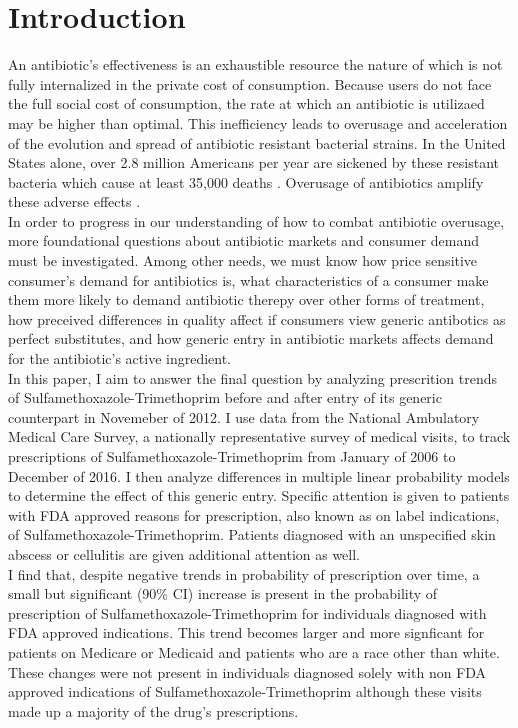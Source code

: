 \chapter{Introduction}
An antibiotic's effectiveness is an exhaustible resource the nature of which is not fully internalized in the private cost of consumption. Because users do not face the full social cost of consumption, the rate at which an antibiotic is utilizaed may be higher than optimal. This inefficiency leads to overusage and acceleration of the evolution and spread of antibiotic resistant bacterial strains. In the United States alone, over 2.8 million Americans per year are sickened by these resistant bacteria which cause at least 35,000 deaths \cite{centers_for_disease_control_and_prevention_us_antibiotic_2019}. Overusage of antibiotics amplify these adverse effects \cite{gerber_outpatient_2019}.\\
\indent In order to progress in our understanding of how to combat antibiotic overusage, more foundational questions about antibiotic markets and consumer demand must be investigated. Among other needs, we must know how price sensitive consumer's demand for antibiotics is, what characteristics of a consumer make them more likely to demand antibiotic therepy over other forms of treatment, how preceived differences in quality affect if consumers view generic antibotics as perfect substitutes, and how generic entry in antibiotic markets affects demand for the antibiotic's active ingredient.\\
\indent In this paper, I aim to answer the final question by analyzing prescrition trends of Sulfamethoxazole-Trimethoprim before and after entry of its generic counterpart in Novemeber of 2012. I use data from the National Ambulatory Medical Care Survey, a nationally representative survey of medical visits, to track prescriptions of Sulfamethoxazole-Trimethoprim from January of 2006 to December of 2016. I then analyze differences in multiple linear probability models to determine the effect of this generic entry. Specific attention is given to patients with FDA approved reasons for prescription, also known as on label indications, of Sulfamethoxazole-Trimethoprim. Patients diagnosed with an unspecified skin abscess or cellulitis are given additional attention as well.\\
\indent I find that, despite negative trends in probability of prescription over time, a small but significant (90\% CI) increase is present in the probability of prescription of Sulfamethoxazole-Trimethoprim for individuals diagnosed with FDA approved indications. This trend becomes larger and more signficant for patients on Medicare or Medicaid and patients who are a race other than white. These changes were not present in individuals diagnosed solely with non FDA approved indications of Sulfamethoxazole-Trimethoprim although these visits made up a majority of the drug's prescriptions.\\
